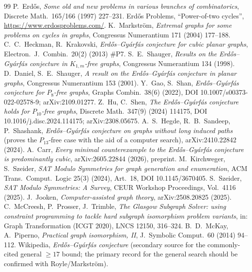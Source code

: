\documentclass[11pt]{article}
\begin{document}
\begin{thebibliography}{99}
 P.~Erd\H{o}s, \emph{Some old and new problems in various
branches of combinatorics}, Discrete Math.\ 165/166 (1997) 227--231.
 Erd\H{o}s Problems, ``Power-of-two cycles'',
\url{https://www.erdosproblems.com/}.
 K.~Markstr\"om, \emph{Extremal graphs for some problems on
cycles in graphs}, Congressus Numerantium 171 (2004) 177--188.
 C.~C.~Heckman, R.~Krakovski, \emph{Erd\H{o}s--Gy\'arf\'as
conjecture for cubic planar graphs}, Electron.\ J.\ Combin.\ 20(2) (2013) \#P7.
 S.~E.~Shauger, \emph{Results on the Erd\H{o}s--Gy\'arf\'as
conjecture in $K_{1,m}$-free graphs}, Congressus Numerantium 134 (1998).
 D.~Daniel, S.~E.~Shauger, \emph{A result on the
Erd\H{o}s--Gy\'arf\'as conjecture in planar graphs}, Congressus Numerantium 153
(2001).
 Y.~Gao, S.~Shan, \emph{Erd\H{o}s--Gy\'arf\'as conjecture for
$P_8$-free graphs}, Graphs Combin.\ 38(6) (2022),
DOI 10.1007/s00373-022-02578-9; arXiv:2109.01277.
 Z.~Hu, C.~Shen, \emph{The Erd\H{o}s--Gy\'arf\'as conjecture holds
for $P_{10}$-free graphs}, Discrete Math.\ 347(9) (2024) 114175,
DOI 10.1016/j.disc.2024.114175; arXiv:2308.05675.
 A.~S.~Hegde, R.~B.~Sandeep, P.~Shashank, \emph{Erd\H{o}s--Gy\'arf\'as
conjecture on graphs without long induced paths} (proves the $P_{13}$-free case
with the aid of a computer search), arXiv:2410.22842 (2024).
 A.~Carr, \emph{Every minimal counterexample to the
Erd\H{o}s--Gy\'arf\'as conjecture is predominantly cubic}, arXiv:2605.22844 (2026),
preprint.
 M.~Kirchweger, S.~Szeider, \emph{SAT Modulo Symmetries for graph
generation and enumeration}, ACM Trans.\ Comput.\ Logic 25(3) (2024), Art.\ 18,
DOI 10.1145/3670405.
 S.~Szeider, \emph{SAT Modulo Symmetries: A Survey},
CEUR Workshop Proceedings, Vol.\ 4116 (2025).
 J.~Jooken, \emph{Computer-assisted graph theory},
arXiv:2508.20825 (2025).
 C.~McCreesh, P.~Prosser, J.~Trimble, \emph{The Glasgow Subgraph
Solver: using constraint programming to tackle hard subgraph isomorphism problem
variants}, in: Graph Transformation (ICGT 2020), LNCS 12150, 316--324.
 B.~D.~McKay, A.~Piperno, \emph{Practical graph isomorphism, II},
J.\ Symbolic Comput.\ 60 (2014) 94--112.
 Wikipedia, \emph{Erd\H{o}s--Gy\'arf\'as conjecture}
(secondary source for the commonly-cited general $\ge 17$ bound; the primary
record for the general search should be confirmed with Royle/Markstr\"om).
\end{thebibliography}
\end{document}
